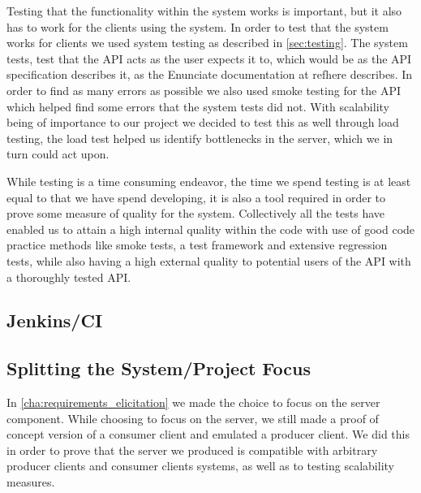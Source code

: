 \bigskip
Testing that the functionality within the system works is important, but it also has to work for the clients using the system.
In order to test that the system works for clients we used system testing as described in \cref{sec:testing}.
The system tests, test that the API acts as the user expects it to, which would be as the API specification describes it, as the Enunciate documentation at refhere describes.
In order to find as many errors as possible we also used smoke testing for the API which helped find some errors that the system tests did not.
With scalability being of importance to our project we decided to test this as well through load testing, the load test helped us identify bottlenecks in the server, which we in turn could act upon.

While testing is a time consuming endeavor, the time we spend testing is at least equal to that we have spend developing, it is also a tool required in order to prove some measure of quality for the system.
Collectively all the tests have enabled us to attain a high internal quality within the code with use of good code practice methods like smoke tests, a test framework and extensive regression tests, while also having a high external quality to potential users of the API with a thoroughly tested API.



\subsection{Jenkins/CI}
\subsection{Splitting the System/Project Focus}
In \cref{cha:requirements_elicitation} we made the choice to focus on the server component.
While choosing to focus on the server, we still made a proof of concept version of a consumer client and emulated a producer client.
We did this in order to prove that the server we produced is compatible with arbitrary producer clients and consumer clients systems, as well as to testing scalability measures.

